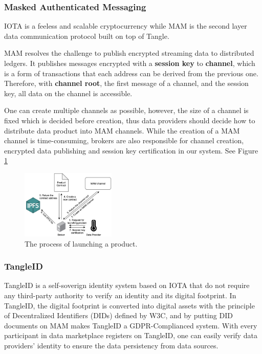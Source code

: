 \documentclass[journal,10pt,a4paper]{IEEEtran}
\begin{document}
\subsubsection{Masked Authenticated Messaging}
IOTA\cite{IOTAwhitepaper} is a feeless and scalable cryptocurrency while MAM is the second layer data communication protocol built on top of Tangle. 

MAM resolves the challenge to publish encrypted streaming data to distributed ledgers. It publishes messages encrypted with a \textbf{session key} to \textbf{channel}, which is a form of transactions that each address can be derived from the previous one. Therefore, with \textbf{channel root}, the first message of a channel, and the session key, all data on the channel is accessible. 

One can create multiple channels as possible, however, the size of a channel is fixed which is decided before creation, thus data providers should decide how to distribute data product into MAM channels. While the creation of a MAM channel is time-consuming, brokers are also responsible for channel creation, encrypted data publishing and session key certification in our system. See Figure \ref{fig:launching_product}  

\begin{figure}[h]
	\centering
	\includegraphics[width=0.4\textwidth]{launching_product}
	\caption{The process of launching a product.}
	\label{fig:launching_product}
\end{figure}

\subsubsection{TangleID}
TangleID\cite{TangleID} is a self-soverign identity system based on IOTA that do not require any third-party authority to verify an identity and its digital footprint. In TangleID, the digital footprint is converted into digital assets with the principle of Decentralized Identifiers (DIDs)\cite{DID} defined by W3C, and by putting DID documents on MAM makes TangleID a GDPR-Complianced system. With every participant in data marketplace registers on TangleID, one can easily verify data providers' identity to ensure the data persistency from data sources.
\end{document}
